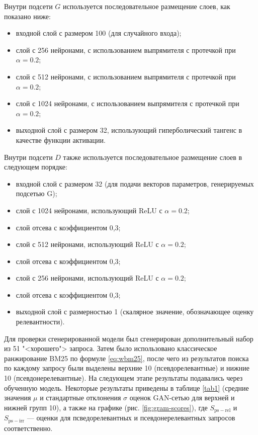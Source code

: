 Внутри подсети $G$ используется последовательное размещение слоев, как показано ниже:
\begin{itemize}
    \item входной слой с размером 100 (для случайного
    входа);
    \item слой с 256 нейронами, с использованием выпрямителя с протечкой при $\alpha = 0.2$;
    \item слой с 512 нейронами, с использованием выпрямителя с протечкой при $\alpha = 0.2$;
    \item слой с 1024 нейронами, с использованием выпрямителя с протечкой при $\alpha = 0.2$;
    \item выходной слой с размером 32, использующий гиперболический тангенс в качестве функции активации.
\end{itemize}
Внутри подсети $D$ также используется последовательное размещение слоев в следующем порядке:
\begin{itemize}
    \item входной слой с размером 32 (для подачи векторов параметров, генерируемых подсетью G);
    \item слой с 1024 нейронами, использующий ReLU с $\alpha = 0.2$;
    \item слой отсева с коэффициентом 0,3;
    \item слой с 512 нейронами, использующий ReLU с $\alpha = 0.2$;
    \item слой отсева с коэффициентом 0,3;
    \item слой с 256 нейронами, использующий ReLU с $\alpha = 0.2$;
    \item слой отсева с коэффициентом 0,3;
    \item выходной слой с размерностью 1 (скалярное значение, обозначающее оценку релевантности).
\end{itemize}

Для проверки сгенерированной модели был сгенерирован дополнительный набор из 51 "<хорошего"> запроса. Затем 
было использовано классическое ранжирование BM25 по формуле \eqref{eq:wbm25}, после чего из результатов поиска 
по каждому запросу были выделены верхние 10 (псевдорелевантные) и нижние 10 (псевдонерелевантные).
На следующем этапе результаты подавались через обученную модель. Некоторые результаты приведены в таблице \ref{tab1}
(средние значения $\mu$ и стандартные отклонения $\sigma$ оценок GAN-сетью для верхней и нижней групп 10), а также
на графике (рис. \ref{fig:gram-scores}), где $S_{\mathrm{ps-rel}}$ и $S_{\mathrm{ps-irr}}$ --- оценки для
псведорелевантных и псевдонерелевантных запросов соответственно.

